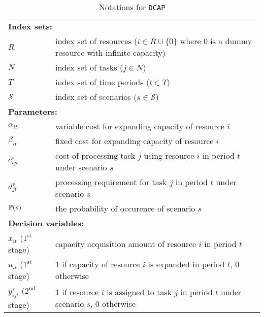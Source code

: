 \begin{table}[H]
	\caption{Notations for \texttt{DCAP}}
	\label{dcap:notation}
	\resizebox{\textwidth}{!}
	{
		\begin{tabular}{ll}
			\toprule
			\multicolumn{2}{l}{\textbf{Index sets:}} \\
			$R$ & index set of resources ($i\in R\cup\{0\}$ where $0$ is a dummy resource with infinite capacity) \\ 
			$N$ & index set of tasks ($j\in N$)\\ 
			$T$ & index set of time periods ($t\in T$)\\
			$\mathcal{S}$ & index set of scenarios ($s\in \mathcal{S}$) \\ \midrule
			\multicolumn{2}{l}{\textbf{Parameters:}} \\
			$\alpha_{it}$ & variable cost for expanding capacity of resource $i$\\ 
			$\beta_{it}$ & fixed cost for expanding capacity of resource $i$ \\ 
			$c_{ijt}^{s}$ & cost of processing task $j$ using resource $i$ in period $t$ under scenario $s$ \\ 
			$d_{jt}^s$	& processing requirement for task $j$ in period $t$ under scenario $s$		\\
			$\operatorname*{\mathbb{P}}(s)$ & \textrm{the probability of occurence of scenario $s$} \\ \midrule
			\multicolumn{2}{l}{\textbf{Decision variables:}} \\
			$x_{it}$ ($1^{\textrm{st}}$ stage) & capacity acquisition amount of resource $i$ in period $t$ \\ 
			$u_{it}$ ($1^{\textrm{st}}$ stage)& 1 if capacity of resource $i$ is expanded in period $t$, 0 otherwise \\ 
			$y_{ijt}^s$ ($2^{\textrm{nd}}$ stage)& 1 if resource $i$ is assigned to task $j$ in period $t$ under scenario $s$, 0 otherwise\\
			\bottomrule
		\end{tabular}
	}
\end{table} 

